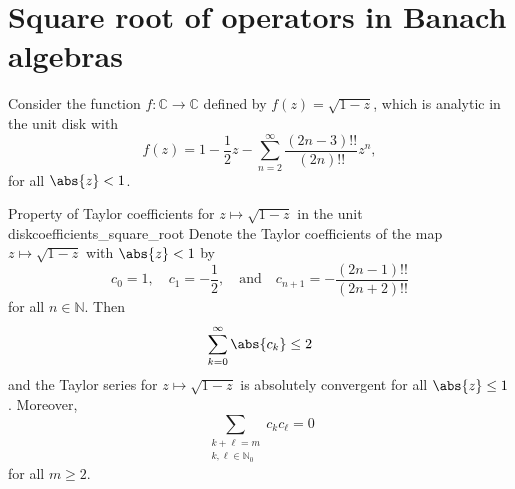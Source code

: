 \section{Square root of operators in Banach algebras}
Consider the function \(f : \mathbb{C} \to \mathbb{C}\) defined by \(f(z) = \sqrt{1 - z}\), which is analytic in the unit disk with
\begin{equation*}
    f(z) = 1 - \frac12z - \sum_{n = 2}^\infty \frac{(2n - 3)!!}{(2n)!!} z^n,
\end{equation*}
for all \(\abs{z} < 1\).
\begin{lemma}{Property of Taylor coefficients for \(z \mapsto \sqrt{1 - z}\) in the unit disk}{coefficients_square_root}
    Denote the Taylor coefficients of the map \(z \mapsto \sqrt{1-z}\) with \(\abs{z} < 1\) by
    \begin{equation*}
        c_0 = 1,\quad c_1 = -\frac12,\quad\text{and}\quad c_{n+1} = -\frac{(2n-1)!!}{(2n+2)!!}
    \end{equation*}
    for all \(n \in \mathbb{N}\). Then
    \begin{equation*}
        \sum_{k = 0}^\infty \abs{c_k} \leq 2
    \end{equation*}
    and the Taylor series for \(z \mapsto \sqrt{1-z}\) is absolutely convergent for all \(\abs{z} \leq 1\). Moreover,
    \begin{equation*}
        \sum_{\substack{k + \ell = m\\k,\ell \in \mathbb{N}_0}}{c_k c_\ell} = 0
    \end{equation*}
    for all \(m \geq 2\).
\end{lemma}
